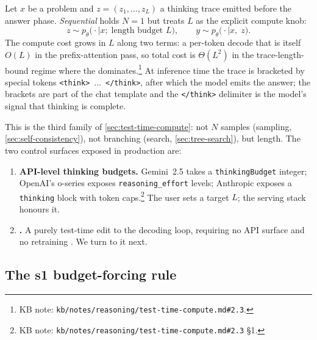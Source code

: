 Let $x$ be a problem and $z = (z_1, \ldots, z_L)$ a thinking trace
emitted before the answer phase. \emph{Sequential} 
holds $N = 1$ but treats $L$ as the explicit compute knob:
\begin{equation}
  z \sim p_\theta\bigl(\cdot \mid x;\; \text{length budget } L\bigr),
  \qquad
  y \sim p_\theta\bigl(\cdot \mid x,\; z\bigr).
  \label{eq:sequential-ttc}
\end{equation}
The compute cost grows in $L$ along two terms: a per-token decode that
is itself $O(L)$ in the prefix-attention pass, so total cost is
$\Theta(L^2)$ in the trace-length-bound regime where the 
dominates.\footnote{KB note:
\nolinkurl{kb/notes/reasoning/test-time-compute.md#2.3}.} At inference
time the trace is bracketed by special tokens
\texttt{<think>}~$\ldots$~\texttt{</think>}, after which the model
emits the answer; the brackets are part of the chat template and the
\texttt{</think>} delimiter is the model's signal that thinking is
complete.

This is the third  family of \cref{sec:test-time-compute}: not
$N$ samples (sampling, \cref{sec:self-consistency}), not branching
(search, \cref{sec:tree-search}), but length. The two control surfaces
exposed in production are:
\begin{enumerate}
  \item \textbf{API-level thinking budgets.} Gemini~2.5 takes a
        \texttt{thinkingBudget} integer; OpenAI's o-series exposes
        \texttt{reasoning\_effort} levels; Anthropic exposes a
        \texttt{thinking} block with token caps.\footnote{KB note:
        \nolinkurl{kb/notes/reasoning/test-time-compute.md#2.3} §1.}
        The user sets a target $L$; the serving stack honours it.
  \item \textbf{.} A purely test-time edit to the
        decoding loop, requiring no API surface and no retraining
        \citep[\S 3.1]{s1-2025}. We turn to it next.
\end{enumerate}

\subsection{The s1 budget-forcing rule}
\label{sec:s1-rule}

